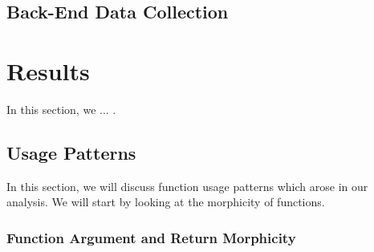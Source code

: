 



%
%
%
%
\subsection{Back-End Data Collection}


%
%
%
%
%
%
\section{Results}

In this section, we ... .

%
%
%
%
\subsection{Usage Patterns}

In this section, we will discuss function usage patterns which arose in our analysis.
We will start by looking at the morphicity of functions.

\subsubsection{Function Argument and Return Morphicity}

